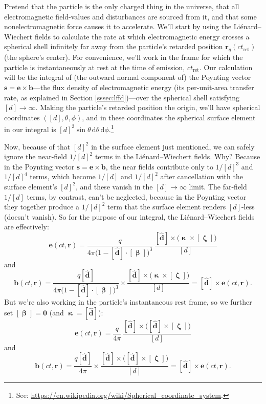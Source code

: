 \documentclass[12pt]{article}
\renewcommand{\vv}[1]{\mathbf{#1}}
\newcommand{\dd}[1]{\mathrm{d}#1}
\newcommand{\vvbeta}{\bm{\upbeta}}
\newcommand{\vvzeta}{\bm{\upzeta}}
\begin{document}
Pretend that the particle is the only charged thing in the universe, that all electromagnetic field-values and disturbances are sourced from it, and that some nonelectromagnetic force causes it to accelerate. We'll start by using the Li\'enard--Wiechert fields to calculate the rate at which electromagnetic energy crosses a spherical shell infinitely far away from the particle's retarded position $\vv r_{q}(ct_{\mathrm{ret}})$ (the sphere's center). For convenience, we'll work in the frame for which the particle is instantaneously at rest at the time of emission, $ct_{\mathrm{ret}}$. Our calculation will be the integral of (the outward normal component of) the Poynting vector $\vv s = \vv e \times \vv b$---the flux density of electromagnetic energy (its per-unit-area transfer rate, as explained in Section \ref{sssec:lffd})---over the spherical shell satisfying $[d] \rightarrow \infty$. Making the particle's retarded position the origin, we'll have spherical coordinates $([d], \theta, \phi)$, and in these coordinates the spherical surface element in our integral is $[d]^2 \sin \theta \, \dd \theta \, \dd \phi$.\footnote{See: \url{https://en.wikipedia.org/wiki/Spherical_coordinate_system}.}

Now, because of that $[d]^2$ in the surface element just mentioned, we can safely ignore the near-field $1 / [d]^2$ terms in the Li\'enard--Wiechert fields. Why? Because in the Poynting vector $\vv s = \vv e \times \vv b$, the near fields contribute only to $1/[d]^3$ and $1/[d]^4$ terms, which become $1/[d]$ and $1/[d]^2$ after cancellation with the surface element's $[d]^2$, and these vanish in the $[d] \rightarrow \infty$ limit. The far-field $1/[d]$ terms, by contrast, can't be neglected, because in the Poynting vector they together produce a $1/[d]^2$ term that the surface element renders $[d]$-less (doesn't vanish). So for the purpose of our integral, the Li\'enard--Wiechert fields are effectively:
\begin{equation*}
\vv e(ct, \vv r) = \dfrac{q}{4 \pi \big( 1 - [\vv{\hat{d}}] \cdot [\vvbeta] \big)^3} \, \dfrac{[\vv{\hat{d}}] \times \big( \vv{\upkappa} \times [\vvzeta] \big)}{[d]}
\end{equation*}
and
\begin{equation*}
\vv b (ct, \vv r) = \dfrac{q [\vv{\hat{d}}]}{4 \pi \big( 1 - [\vv{\hat{d}}] \cdot [\vvbeta] \big)^3} \times \dfrac{[\vv{\hat{d}}] \times \big( \vv{\upkappa} \times [\vvzeta] \big)}{[d]} = [\vv{\hat{d}}] \times \vv e (ct, \vv r).
\end{equation*}
But we're also working in the particle's instantaneous rest frame, so we further set $[\vvbeta] = \vv 0$ (and $\vv{\upkappa} = [\vv{\hat{d}}]$):
\begin{equation*}
\vv e(ct, \vv r) = \dfrac{q}{4 \pi} \, \dfrac{[\vv{\hat{d}}] \times \big( [\vv{\hat{d}}] \times [\vvzeta] \big)}{[d]}
\end{equation*}
and
\begin{equation*}
\vv b (ct, \vv r) = \dfrac{q [\vv{\hat{d}}]}{4 \pi} \times \dfrac{[\vv{\hat{d}}] \times \big( [\vv{\hat{d}}] \times [\vvzeta] \big)}{[d]} = [\vv{\hat{d}}] \times \vv e (ct, \vv r).
\end{equation*}
\end{document}
